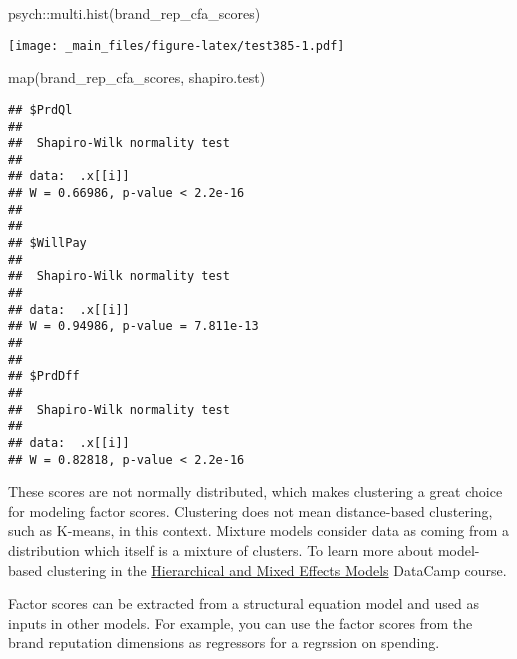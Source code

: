 \documentclass[
]{book}
\newenvironment{Shaded}{\begin{snugshade}}{\end{snugshade}}
\newcommand{\AttributeTok}[1]{\textcolor[rgb]{0.77,0.63,0.00}{#1}}
\newcommand{\FunctionTok}[1]{\textcolor[rgb]{0.00,0.00,0.00}{#1}}
\newcommand{\NormalTok}[1]{#1}
\newcommand{\OtherTok}[1]{\textcolor[rgb]{0.56,0.35,0.01}{#1}}
\newcommand{\SpecialCharTok}[1]{\textcolor[rgb]{0.00,0.00,0.00}{#1}}
\theoremstyle{definition}
\theoremstyle{definition}
\theoremstyle{definition}
\theoremstyle{definition}
\theoremstyle{remark}
\begin{document}
\begin{Shaded}
\begin{Highlighting}[]
\NormalTok{psych}\SpecialCharTok{::}\FunctionTok{multi.hist}\NormalTok{(brand\_rep\_cfa\_scores)}
\end{Highlighting}
\end{Shaded}

\texttt{[image: \_main\_files/figure-latex/test385-1.pdf]}

\begin{Shaded}
\begin{Highlighting}[]
\FunctionTok{map}\NormalTok{(brand\_rep\_cfa\_scores, shapiro.test)}
\end{Highlighting}
\end{Shaded}

\begin{verbatim}
## $PrdQl
## 
##  Shapiro-Wilk normality test
## 
## data:  .x[[i]]
## W = 0.66986, p-value < 2.2e-16
## 
## 
## $WillPay
## 
##  Shapiro-Wilk normality test
## 
## data:  .x[[i]]
## W = 0.94986, p-value = 7.811e-13
## 
## 
## $PrdDff
## 
##  Shapiro-Wilk normality test
## 
## data:  .x[[i]]
## W = 0.82818, p-value < 2.2e-16
\end{verbatim}

These scores are not normally distributed, which makes clustering a great choice for modeling factor scores. Clustering does not mean distance-based clustering, such as K-means, in this context. Mixture models consider data as coming from a distribution which itself is a mixture of clusters. To learn more about model-based clustering in the \href{https://www.datacamp.com/courses/hierarchical-and-mixed-effects-models}{Hierarchical and Mixed Effects Models} DataCamp course.

Factor scores can be extracted from a structural equation model and used as inputs in other models. For example, you can use the factor scores from the brand reputation dimensions as regressors for a regrssion on spending.

\begin{Shaded}
\end{Shaded}
\end{document}
